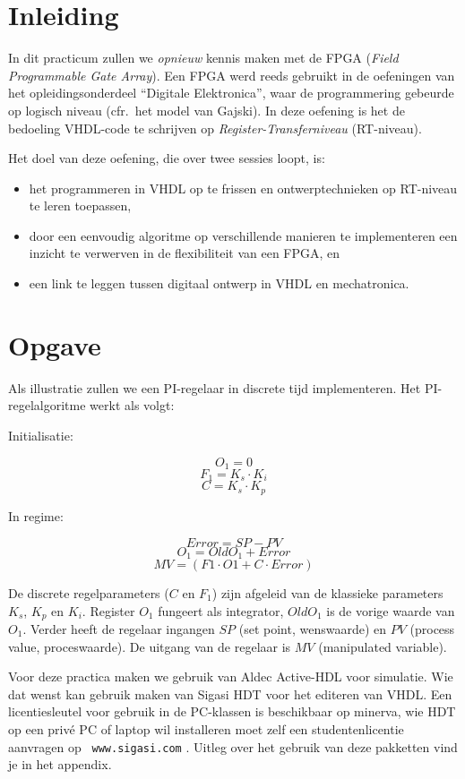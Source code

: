 
\section{Inleiding}
In dit practicum zullen we {\em opnieuw} kennis maken met de FPGA 
({\em Field Programmable Gate Array}). Een FPGA werd reeds gebruikt in de 
oefeningen van het opleidingsonderdeel ``Digitale Elektronica'', waar de programmering 
gebeurde op logisch niveau (cfr.\ het model van Gajski). In deze oefening 
is het de bedoeling VHDL-code te schrijven op {\em Register-Transferniveau}
(RT-niveau). 

Het doel van deze oefening, die over twee sessies loopt, is:
\begin{itemize}
\item het programmeren in VHDL op te frissen en ontwerptechnieken op RT-niveau te leren 
toepassen, 
\item door een een\-vou\-dig algoritme op ver\-schil\-len\-de ma\-nie\-ren te 
im\-ple\-men\-te\-ren een inzicht te verwerven in de flexibiliteit van een FPGA, en
\item een link te leggen tussen digitaal ontwerp in VHDL en mechatronica.
\end{itemize}

\section{Opgave}

Als illustratie zullen we een PI-regelaar in discrete tijd
implementeren.  Het PI-regelalgoritme werkt als volgt:

Initialisatie:

$$O_1 = 0$$
$$F_1 = K_s \cdot K_i$$
$$C = K_s \cdot K_p$$

In regime:

$$Error = SP - PV$$
$$O_1 = OldO_1 + Error$$
$$MV = (F1 \cdot O1 + C \cdot Error)$$

De discrete regelparameters ($C$ en $F_1$) zijn afgeleid van de
klassieke parameters $K_s$, $K_p$ en $K_i$.  Register $O_1$ fungeert
als integrator, $OldO_1$ is de vorige waarde van $O_1$.  Verder heeft
de regelaar ingangen $SP$ (set point, wenswaarde) en $PV$ (process
value, proceswaarde).  De uitgang van de regelaar is $MV$ (manipulated
variable).

Voor deze practica maken we gebruik van Aldec Active-HDL voor
simulatie.  Wie dat wenst kan gebruik maken van Sigasi HDT voor het
editeren van VHDL. Een licentiesleutel voor gebruik in de PC-klassen
is beschikbaar op minerva, wie HDT op een priv\'e PC of laptop wil
installeren moet zelf een studentenlicentie aanvragen op {\tt
www.sigasi.com} .  Uitleg over het gebruik van deze pakketten vind je
in het appendix.


